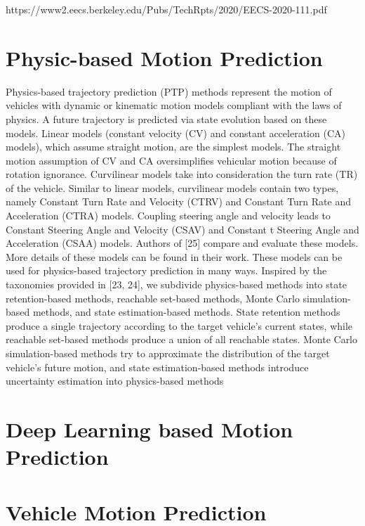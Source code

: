 https://www2.eecs.berkeley.edu/Pubs/TechRpts/2020/EECS-2020-111.pdf

\cite{huang2022survey}

\section{Physic-based Motion Prediction}
\label{sec:2_physic_based_mp}

Physics-based trajectory prediction (PTP) methods represent the motion of vehicles with dynamic or kinematic motion models compliant with the laws of physics. A future trajectory is predicted via state evolution based on these models. Linear models (constant velocity (CV) and constant acceleration (CA) models), which assume straight motion, are the simplest models. The straight motion assumption of
CV and CA oversimplifies vehicular motion because of rotation ignorance. Curvilinear models take into consideration the turn rate (TR) of the vehicle. Similar to
linear models, curvilinear models contain two types, namely Constant Turn Rate
and Velocity (CTRV) and Constant Turn Rate and Acceleration (CTRA) models. Coupling steering angle and velocity leads to Constant Steering Angle and
Velocity (CSAV) and Constant t Steering Angle and Acceleration (CSAA) models.
Authors of [25] compare and evaluate these models. More details of these models
can be found in their work. These models can be used for physics-based trajectory
prediction in many ways.
Inspired by the taxonomies provided in [23, 24], we subdivide physics-based methods into state retention-based methods, reachable set-based methods, Monte Carlo
simulation-based methods, and state estimation-based methods. State retention
methods produce a single trajectory according to the target vehicle’s current states,
while reachable set-based methods produce a union of all reachable states. Monte
Carlo simulation-based methods try to approximate the distribution of the target
vehicle’s future motion, and state estimation-based methods introduce uncertainty
estimation into physics-based methods

\section{Deep Learning based Motion Prediction}
\label{sec:2_dl_based_mp}

\section{Vehicle Motion Prediction}
\label{sec:2_vehicle_based_mp}